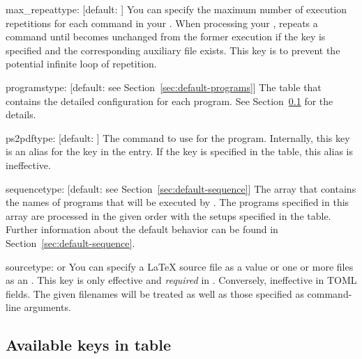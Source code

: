 \documentclass[draft]{llmk-doc}
\begin{document}
\begin{confkey}{max\_repeat}{type: }[default: ]
You can specify the maximum number of execution repetitions for each command in
your . When processing your ,  repeats
a command until  becomes unchanged from the former execution if
the key is specified and the corresponding auxiliary file exists. This key is to
prevent the potential infinite loop of repetition.
\end{confkey}

\begin{confkey}{programs}{type: }
  [default: see Section~\ref{sec:default-programs}]
The table that contains the detailed configuration for each program. See
Section~\ref{sec:keys-in-programs} for the details.
\end{confkey}

\begin{confkey}{ps2pdf}{type: }[default: ]
The command to use for the  program. Internally, this key is
an alias for the  key in the  entry. If the
 key is specified in the  table, this alias is
ineffective.
\end{confkey}

\begin{confkey}{sequence}{type: }
  [default: see Section~\ref{sec:default-sequence}]
The array that contains the names of programs that will be executed by
. The programs specified in this array are processed in the given
order with the setups specified in the  table. Further
information about the default behavior can be found in
Section~\ref{sec:default-sequence}.
\end{confkey}

\begin{confkey}{source}{type:  or }
You can specify a {\LaTeX} source file as a  value or one or more
files as an . This key is only effective and
\emph{required} in . Conversely, ineffective in TOML fields.
The given filenames will be treated as well as those specified as command-line
arguments.
\end{confkey}

\subsection{Available keys in  table}
\label{sec:keys-in-programs}
\end{document}
